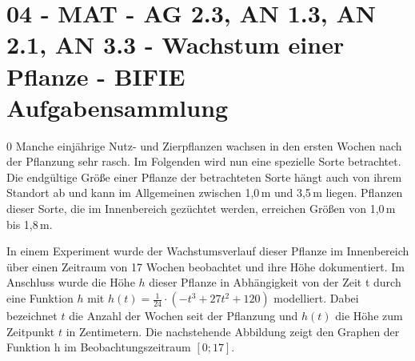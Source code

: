\section{04 - MAT - AG 2.3, AN 1.3, AN 2.1, AN 3.3 - Wachstum einer Pflanze - BIFIE Aufgabensammlung}

\begin{langesbeispiel} \item[0] %
Manche einjährige Nutz- und Zierpflanzen wachsen in den ersten Wochen nach der Pflanzung sehr rasch. Im Folgenden wird nun eine spezielle Sorte betrachtet. Die endgültige Größe einer
Pflanze der betrachteten Sorte hängt auch von ihrem Standort ab und kann im Allgemeinen zwischen 1,0\,m und 3,5\,m liegen. Pflanzen dieser Sorte, die im Innenbereich gezüchtet werden,
erreichen Größen von 1,0\,m bis 1,8\,m. 

In einem Experiment wurde der Wachstumsverlauf dieser Pflanze im Innenbereich über einen Zeitraum von 17 Wochen beobachtet und ihre Höhe dokumentiert. Im Anschluss wurde die
Höhe $h$ dieser Pflanze in Abhängigkeit von der Zeit t durch eine Funktion $h$ mit $h(t) = \frac{1}{24}\cdot \left(-t^3+27t^2+120\right)$ modelliert. Dabei bezeichnet $t$ die Anzahl der Wochen seit der Pflanzung und $h(t)$ die Höhe zum Zeitpunkt $t$ in Zentimetern. Die nachstehende Abbildung zeigt den Graphen der Funktion h im Beobachtungszeitraum $[0; 17]$.

\begin{center}
\end{center}%


\end{langesbeispiel}
